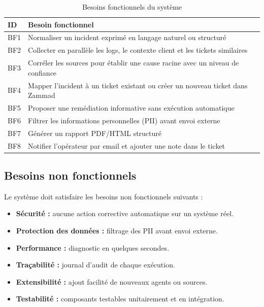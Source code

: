 \begin{table}[H]
    \centering
    \renewcommand{\arraystretch}{1.2}
    \begin{tabular}{|l|p{10cm}|}
        \hline
        \rowcolor{iNavy} \textbf{\color{white}ID} & \textbf{\color{white}Besoin fonctionnel} \\ \hline
        BF1 & Normaliser un incident exprimé en langage naturel ou structuré \\ \hline
        BF2 & Collecter en parallèle les logs, le contexte client et les tickets similaires \\ \hline
        BF3 & Corréler les sources pour établir une cause racine avec un niveau de confiance \\ \hline
        BF4 & Mapper l'incident à un ticket existant ou créer un nouveau ticket dans Zammad \\ \hline
        BF5 & Proposer une remédiation informative sans exécution automatique \\ \hline
        BF6 & Filtrer les informations personnelles (PII) avant envoi externe \\ \hline
        BF7 & Générer un rapport PDF/HTML structuré \\ \hline
        BF8 & Notifier l'opérateur par email et ajouter une note dans le ticket \\ \hline
    \end{tabular}
    \caption{Besoins fonctionnels du système}
    \label{tab:besoins_fonctionnels}
\end{table}

\subsection{Besoins non fonctionnels}
Le système doit satisfaire les besoins non fonctionnels suivants :

\begin{itemize}
    \setlength\itemsep{0.1em}
    \setlength\parskip{0pt}
    \setlength\parsep{0pt}
    \item \textbf{Sécurité :} aucune action corrective automatique sur un système réel.
    \item \textbf{Protection des données :} filtrage des PII avant envoi externe.
    \item \textbf{Performance :} diagnostic en quelques secondes.
    \item \textbf{Traçabilité :} journal d'audit de chaque exécution.
    \item \textbf{Extensibilité :} ajout facilité de nouveaux agents ou sources.
    \item \textbf{Testabilité :} composants testables unitairement et en intégration.
\end{itemize}

